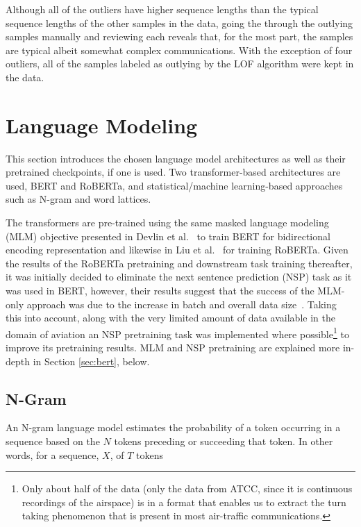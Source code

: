 \documentclass[12pt]{article}
\begin{document}
Although all of the outliers have higher sequence lengths than the typical sequence lengths of the other samples in the data, going the through
the outlying samples manually and reviewing each reveals that, for the most part, the samples are typical albeit somewhat complex communications.
With the exception of four outliers, all of the samples labeled as outlying by the LOF algorithm were kept in the data.

\section{Language Modeling}\label{sec:language_modeling}
This section introduces the chosen language model architectures as well as their pretrained checkpoints, if one is used. Two transformer-based
architectures are used, BERT and RoBERTa, and statistical/machine learning-based approaches such as N-gram and word lattices.

The transformers are pre-trained using the same masked language modeling (MLM) objective presented in Devlin et al.~\cite{devlin_bert_2019} to train
BERT for bidirectional encoding representation and likewise in Liu et al.~\cite{liu_roberta_2019} for training RoBERTa. Given the results of the
RoBERTa pretraining and downstream task training thereafter, it was initially decided to eliminate the next sentence prediction (NSP) task as it was
used in BERT, however, their results suggest that the success of the MLM-only approach was due to the increase in batch and overall data
size~\cite{liu_roberta_2019}. Taking this into account, along with the very limited amount of data available in the domain of aviation an NSP
pretraining task was implemented where possible\footnote{Only about half of the data (only the data from ATCC, since it is continuous recordings of
    the airspace) is in a format that enables us to extract the turn taking phenomenon that is present in most air-traffic communications.} to improve
its pretraining results. MLM and NSP pretraining are explained more in-depth in Section \ref{sec:bert}, below.

\subsection{N-Gram}\label{sec:ngram}
An N-gram language model estimates the probability of a token occurring in a sequence based on the \(N\) tokens preceding or succeeding that token.
In other words, for a sequence, $X$, of $T$ tokens
\end{document}

